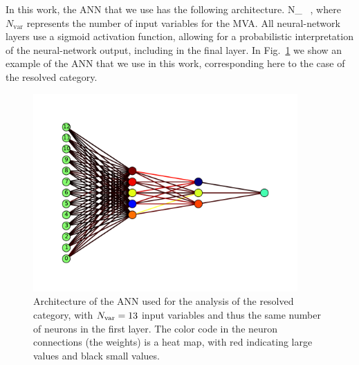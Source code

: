 In this work, the ANN that we use has the following architecture.
\be
\label{eq:nn1}
N_{} \, ,
\ee
where $N_{\mathrm{var}}$ represents the number of input variables for the MVA.
All neural-network layers use a sigmoid activation function, allowing
for a probabilistic
interpretation of the neural-network output, including in the final layer.
%
In Fig.~\ref{fig:nnarch} we show an example of the ANN that we use in this work, corresponding here
to the case of the resolved category.

\begin{figure}[t]
  \begin{center}
      \vspace{-1cm}
  \includegraphics[width=0.90\textwidth]{plots/res_nnarch.pdf}
  \vspace{-1cm}
\caption{\small Architecture of the ANN used for the analysis of the resolved
  category, with $N_{\rm var}=13$ input variables and thus the same number of neurons
  in the first layer.
  The color code in the neuron connections (the weights) is a heat map,
  with red indicating large values and black small values.
}
\label{fig:nnarch}
\end{center}
\end{figure}


